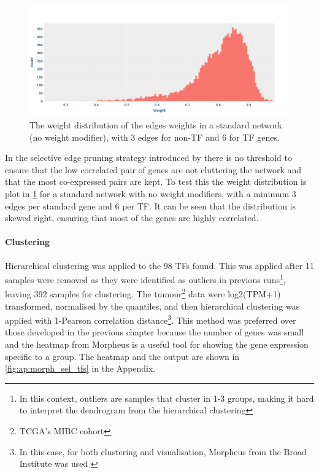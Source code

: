 \begin{figure}[!ht]   
\centering
\includegraphics[width=1.0\textwidth,height=1.0\textheight,keepaspectratio]{Sections/Network_I/Resources/selective_pruning/weight_distrib.png}
  \caption{The weight distribution of the edges weights in a standard network (no weight modifier), with 3 edges for non-TF and 6 for TF genes.}
\label{fig:N_I:weight_distrib}
\end{figure}

In the selective edge pruning strategy introduced by \citet{Care2019-ij} there is no threshold to ensure that the low correlated pair of genes are not cluttering the network and that the most co-expressed pairs are kept. To test this the weight distribution is plot in \cref{fig:N_I:weight_distrib} for a standard network with no weight modifiers, with a minimum 3 edges per standard gene and 6 per TF. It can be seen that the distribution is skewed right, ensuring that most of the genes are highly correlated.

\paragraph*{Clustering}


Hierarchical clustering was applied to the 98 TFs found. This was applied after 11 samples were removed as they were identified as outliers in previous runs\footnote{In this context, outliers are samples that cluster in 1-3 groups, making it hard to interpret the dendrogram from the hierarchical clustering}, leaving 392 samples for clustering. The tumour\footnote{TCGA's MIBC cohort} data were log2(TPM+1) transformed, normalised by the quantiles, and then hierarchical clustering was applied with 1-Pearson correlation distance\footnote{In this case, for both clustering and visualisation, Morpheus from the Broad Institute was used \cite{noauthor_undated-uz}}. This method was preferred over those developed in the previous chapter because the number of genes was small and the heatmap from Morpheus is a useful tool for showing the gene expression specific to a group. The heatmap and the output are shown in \cref{fig:ap:morph_sel_tfs} in the Appendix.

